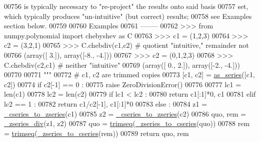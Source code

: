 \begin{DoxyCode}
00756 \textcolor{stringliteral}{    is typically necessary to "re-project" the results onto said basis}
00757 \textcolor{stringliteral}{    set, which typically produces "un-intuitive" (but correct) results;}
00758 \textcolor{stringliteral}{    see Examples section below.}
00759 \textcolor{stringliteral}{}
00760 \textcolor{stringliteral}{    Examples}
00761 \textcolor{stringliteral}{    --------}
00762 \textcolor{stringliteral}{    >>> from numpy.polynomial import chebyshev as C}
00763 \textcolor{stringliteral}{    >>> c1 = (1,2,3)}
00764 \textcolor{stringliteral}{    >>> c2 = (3,2,1)}
00765 \textcolor{stringliteral}{    >>> C.chebdiv(c1,c2) # quotient "intuitive," remainder not}
00766 \textcolor{stringliteral}{    (array([ 3.]), array([-8., -4.]))}
00767 \textcolor{stringliteral}{    >>> c2 = (0,1,2,3)}
00768 \textcolor{stringliteral}{    >>> C.chebdiv(c2,c1) # neither "intuitive"}
00769 \textcolor{stringliteral}{    (array([ 0.,  2.]), array([-2., -4.]))}
00770 \textcolor{stringliteral}{}
00771 \textcolor{stringliteral}{    """}
00772     \textcolor{comment}{# c1, c2 are trimmed copies}
00773     [c1, c2] = \hyperlink{namespacepyneb_1_1utils_1_1polyutils_a9c3751d438f0f75922155c7823fe2699}{as\_series}([c1, c2])
00774     \textcolor{keywordflow}{if} c2[-1] == 0 :
00775         \textcolor{keywordflow}{raise} ZeroDivisionError()
00776 
00777     lc1 = len(c1)
00778     lc2 = len(c2)
00779     \textcolor{keywordflow}{if} lc1 < lc2 :
00780         \textcolor{keywordflow}{return} c1[:1]*0, c1
00781     \textcolor{keywordflow}{elif} lc2 == 1 :
00782         \textcolor{keywordflow}{return} c1/c2[-1], c1[:1]*0
00783     \textcolor{keywordflow}{else} :
00784         z1 = \hyperlink{namespacepyneb_1_1utils_1_1chebyshev_a3340d022485b954c9c722b6eaa456ebb}{\_cseries\_to\_zseries}(c1)
00785         z2 = \hyperlink{namespacepyneb_1_1utils_1_1chebyshev_a3340d022485b954c9c722b6eaa456ebb}{\_cseries\_to\_zseries}(c2)
00786         quo, rem = \hyperlink{namespacepyneb_1_1utils_1_1chebyshev_a9ec3445ca77071adc655bacf9299c451}{\_zseries\_div}(z1, z2)
00787         quo = \hyperlink{namespacepyneb_1_1utils_1_1polyutils_a973183162fdba436dae4946ec78c009b}{trimseq}(\hyperlink{namespacepyneb_1_1utils_1_1chebyshev_aa21c9418f1740d12b80ab1563f49ce0b}{\_zseries\_to\_cseries}(quo))
00788         rem = \hyperlink{namespacepyneb_1_1utils_1_1polyutils_a973183162fdba436dae4946ec78c009b}{trimseq}(\hyperlink{namespacepyneb_1_1utils_1_1chebyshev_aa21c9418f1740d12b80ab1563f49ce0b}{\_zseries\_to\_cseries}(rem))
00789         \textcolor{keywordflow}{return} quo, rem

\end{DoxyCode}
